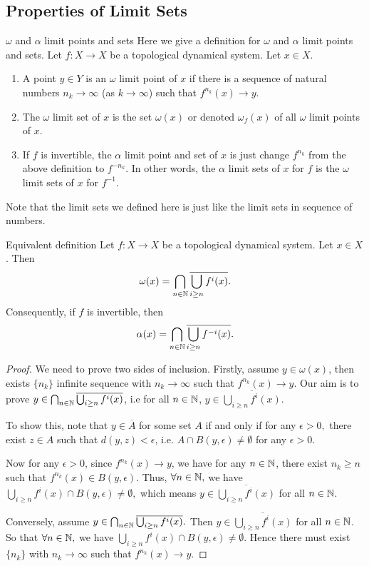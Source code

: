 \documentclass[12pt,a4paper]{article}
\begin{document}
	\subsection{Properties of Limit Sets}
	\begin{definition}{$\omega$ and $\alpha$ limit points and sets}{}
		Here we give a definition for $\omega$ and $\alpha$ limit points and sets. Let $f:X\rightarrow X$ be a topological dynamical system. Let $x\in X$. 
		\begin{enumerate}
			\item A point $y\in Y$ is an $\omega$ limit point of $x$ if there is a sequence of natural numbers $n_k\to \infty$ (as $k\to \infty$) such that $f^{n_k}(x)\to y$.
			\item The $\omega$ limit set of $x$ is the set $\omega(x)$ or denoted $\omega_f(x)$ of all $\omega$ limit points of $x$.
			\item If $f$ is invertible, the $\alpha$ limit point and set of $x$ is just change $f^{n_k}$ from the above definition to $f^{-n_k}$. In other words, the $\alpha$ limit sets of $x$ for $f$ is the $\omega$ limit sets of $x$ for $f^{-1}$. 
		\end{enumerate}
	\end{definition}
	Note that the limit sets we defined here is just like the limit sets in sequence of numbers.
	\begin{proposition}{Equivalent definition}{}
		 Let $f:X\rightarrow X$ be a topological dynamical system. Let $x\in X$. Then
		 $$
		 \omega(x)=\bigcap_{n\in\mathbb{N}}\overline{\bigcup_{i\geq n} f^i(x)}.
		 $$
		 Consequently, if $f$ is invertible, then
		 $$
		 \alpha(x)=\bigcap_{n\in\mathbb{N}}\overline{\bigcup_{i\geq n} f^{-i}(x)}.
		 $$
	\end{proposition}
	\begin{proof}
		We need to prove two sides of inclusion. Firstly, assume $y\in\omega(x)$, then exists $\{n_{k}\}$ infinite sequence with $n_k\to \infty $ such that $f^{n_k}(x)\to y$. Our aim is to prove $y\in \bigcap_{n\in\mathbb{N}}\overline{\bigcup_{i\geq n} f^i(x)}$, i.e for all $n\in\mathbb{N}$, $y\in \overline{\bigcup_{i\geq n} f^i(x)}$. 
		
		To show this, note that $y\in \overline{A}$ for some set $A$ if and only if for any $\epsilon>0,$ there exist $z\in A$ such that $d(y,z)<\epsilon$, i.e. $A\cap B(y,\epsilon)\neq \emptyset$ for any $\epsilon>0$.
		
		Now for any $\epsilon>0$, since $f^{n_k}(x)\to y$, we have for any $n\in \mathbb{N}$, there exist $n_k\geq n$ such that $f^{n_k}(x)\in B(y,\epsilon)$. Thus, $\forall n\in \mathbb{N},$ we have
		$\bigcup_{i\geq n} f^i(x)\cap B(y,\epsilon)\neq \emptyset,$
		which means $y\in \overline{\bigcup_{i\geq n} f^i(x)}$ for all $n\in \mathbb{N}$. 
		
		Conversely, assume $y\in\bigcap_{n\in\mathbb{N}}\overline{\bigcup_{i\geq n} f^i(x)}.$ Then $y\in \overline{\bigcup_{i\geq n} f^i(x)}$ for all $n\in \mathbb{N}$. So that $\forall n\in \mathbb{N},$ we have
		$\bigcup_{i\geq n} f^i(x)\cap B(y,\epsilon)\neq \emptyset.$ Hence there must exist $\{n_k\}$ with $n_k\to \infty$ such that $f^{n_k}(x)\to y$.
	\end{proof}
\end{document}
